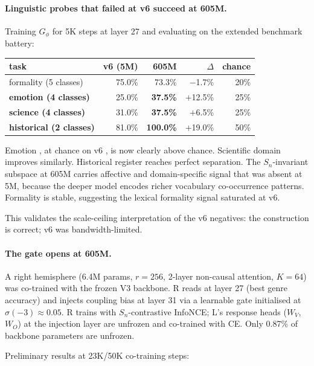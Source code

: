 \documentclass[11pt, a4paper]{article}
\theoremstyle{plain}
\theoremstyle{definition}
\theoremstyle{remark}
\begin{document}
\paragraph{Linguistic probes that failed at v6 succeed at 605M.}

Training $G_\phi$ for 5K steps at layer 27 and evaluating on the extended benchmark battery:

\begin{center}
\small
\begin{tabular}{lrrrr}
\toprule
task & v6 (5M) & 605M & $\Delta$ & chance \\
\midrule
formality (5 classes)       & 75.0\% & 73.3\% & $-$1.7\% & 20\% \\
\textbf{emotion (4 classes)}  & 25.0\% & \textbf{37.5\%} & $+$12.5\% & 25\% \\
\textbf{science (4 classes)}  & 31.0\% & \textbf{37.5\%} & $+$6.5\% & 25\% \\
\textbf{historical (2 classes)} & 81.0\% & \textbf{100.0\%} & $+$19.0\% & 50\% \\
\bottomrule
\end{tabular}
\end{center}

Emotion ,  at chance on v6 ,  is now clearly above chance. Scientific domain improves similarly. Historical register reaches perfect separation. The $S_n$-invariant subspace at 605M carries affective and domain-specific signal that was absent at 5M, because the deeper model encodes richer vocabulary co-occurrence patterns. Formality is stable, suggesting the lexical formality signal saturated at v6.

This validates the scale-ceiling interpretation of the v6 negatives: the construction is correct; v6 was bandwidth-limited.

\paragraph{The gate opens at 605M.}

A right hemisphere (6.4M params, $r{=}256$, 2-layer non-causal attention, $K{=}64$) was co-trained with the frozen V3 backbone. R reads at layer 27 (best genre accuracy) and injects coupling bias at layer 31 via a learnable gate initialised at $\sigma(-3) \approx 0.05$. R trains with $S_n$-contrastive InfoNCE; L's response heads ($W_V$, $W_O$) at the injection layer are unfrozen and co-trained with CE. Only 0.87\% of backbone parameters are unfrozen.

Preliminary results at 23K/50K co-training steps:
\end{document}
